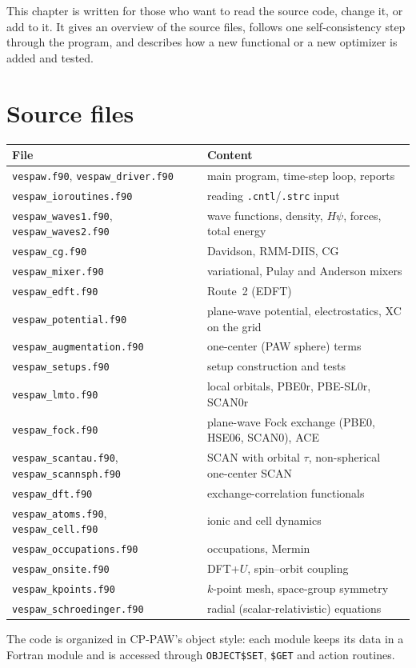\documentclass[11pt,a4paper,oneside]{book}
\newcommand{\pbezero}{PBE0r}
\newcommand{\scanzero}{SCAN0r}
\newcommand{\pbeslzero}{PBE-SL0r}
\begin{document}
This chapter is written for those who want to read the source code,
change it, or add to it. It gives an overview of the source files,
follows one self-consistency step through the program, and describes
how a new functional or a new optimizer is added and tested.


\section{Source files}

\begin{center}
\begin{tabular}{@{}ll@{}}
\toprule
File & Content \\
\midrule
\texttt{vespaw.f90}, \texttt{vespaw\_driver.f90} & main program, time-step loop, reports \\
\texttt{vespaw\_ioroutines.f90} & reading \texttt{.cntl}/\texttt{.strc} input \\
\texttt{vespaw\_waves1.f90}, \texttt{vespaw\_waves2.f90} & wave functions, density, $H\psi$, forces, total energy \\
\texttt{vespaw\_cg.f90} & Davidson, RMM-DIIS, CG \\
\texttt{vespaw\_mixer.f90} & variational, Pulay and Anderson mixers \\
\texttt{vespaw\_edft.f90} & Route~2 (EDFT) \\
\texttt{vespaw\_potential.f90} & plane-wave potential, electrostatics, XC on the grid \\
\texttt{vespaw\_augmentation.f90} & one-center (PAW sphere) terms \\
\texttt{vespaw\_setups.f90} & setup construction and tests \\
\texttt{vespaw\_lmto.f90} & local orbitals, \pbezero, \pbeslzero, \scanzero \\
\texttt{vespaw\_fock.f90} & plane-wave Fock exchange (PBE0, HSE06, SCAN0), ACE \\
\texttt{vespaw\_scantau.f90}, \texttt{vespaw\_scannsph.f90} & SCAN with orbital $\tau$, non-spherical one-center SCAN \\
\texttt{vespaw\_dft.f90} & exchange-correlation functionals \\
\texttt{vespaw\_atoms.f90}, \texttt{vespaw\_cell.f90} & ionic and cell dynamics \\
\texttt{vespaw\_occupations.f90} & occupations, Mermin \\
\texttt{vespaw\_onsite.f90} & DFT+$U$, spin--orbit coupling \\
\texttt{vespaw\_kpoints.f90} & $k$-point mesh, space-group symmetry \\
\texttt{vespaw\_schroedinger.f90} & radial (scalar-relativistic) equations \\
\bottomrule
\end{tabular}
\end{center}
The code is organized in CP-PAW's object style: each module keeps its
data in a Fortran module and is accessed through \texttt{OBJECT\$SET},
\texttt{\$GET} and action routines.
\end{document}
